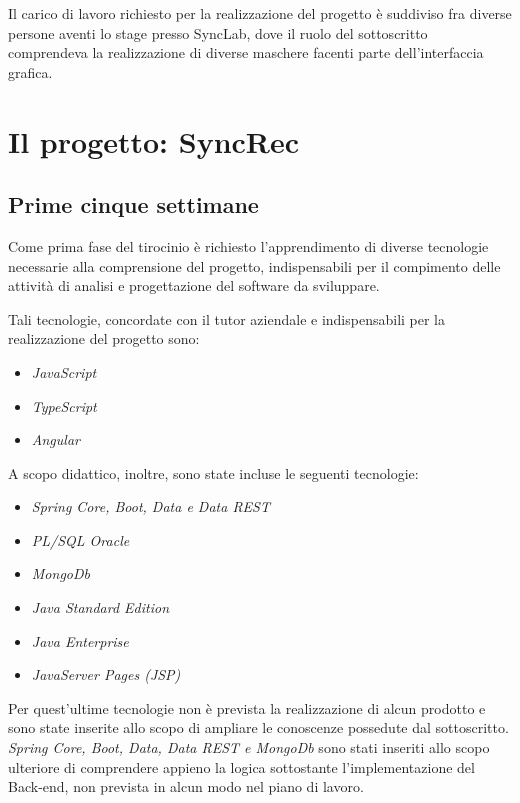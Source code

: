 Il carico di lavoro richiesto per la realizzazione del progetto è suddiviso fra diverse persone aventi lo stage presso SyncLab, dove il ruolo del sottoscritto comprendeva la realizzazione di diverse maschere facenti parte dell'interfaccia grafica.\\

\section{Il progetto: SyncRec}\label{ch-2.2}
\subsection{Prime cinque settimane}
Come prima fase del tirocinio è richiesto l'apprendimento di diverse tecnologie necessarie alla comprensione del progetto,  indispensabili per il compimento delle attività di analisi e progettazione del software da sviluppare.

Tali tecnologie, concordate con il tutor aziendale e indispensabili per la realizzazione del progetto sono:
\begin{itemize}
	\item \textit{JavaScript}
	\item \textit{TypeScript}
	\item \textit{Angular}
\end{itemize}

A scopo didattico, inoltre, sono state incluse le seguenti tecnologie:
\begin{itemize}
	\item \textit{Spring Core, Boot, Data e Data REST}
	\item \textit{PL/SQL Oracle}
	\item \textit{MongoDb}
	\item \textit{Java Standard Edition}
	\item \textit{Java Enterprise}
	\item \textit{JavaServer Pages (JSP)}
\end{itemize}


Per quest'ultime tecnologie non è prevista la realizzazione di alcun prodotto e sono state inserite allo scopo di ampliare le conoscenze possedute dal sottoscritto.\\
\textit{Spring Core, Boot, Data, Data REST e MongoDb} sono stati inseriti allo scopo ulteriore di comprendere appieno la logica sottostante l'implementazione del Back-end, non prevista in alcun modo nel piano di lavoro.\\

